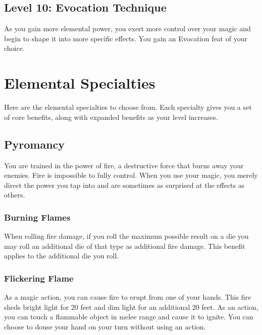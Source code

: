 \documentclass[12pt,letterpaper,twocolumn,openany,nodeprecatedcode,bg=none]{dndbook}
\begin{document}
\subsection{Level 10: Evocation
Technique}\label{level-10-evocation-technique}

As you gain more elemental power, you exert more control over your magic
and begin to shape it into more specific effects. You gain an Evocation
feat of your choice.

\clearpage

\section{Elemental Specialties}\label{elemental-specialties}

Here are the elemental specialties to choose from. Each specialty gives
you a set of core benefits, along with expanded benefits as your level
increases.

\subsection{Pyromancy}\label{pyromancy}

You are trained in the power of fire, a destructive force that burns
away your enemies. Fire is impossible to fully control. When you use
your magic, you merely direct the power you tap into and are sometimes
as surprised at the effects as others.

\subsubsection{Burning Flames}\label{burning-flames}

When rolling fire damage, if you roll the maximum possible result on a
die you may roll an additional die of that type as additional fire
damage. This benefit applies to the additional die you roll.

\subsubsection{Flickering Flame}\label{flickering-flame}

As a magic action, you can cause fire to erupt from one of your hands.
This fire sheds bright light for 20 feet and dim light for an additional
20 feet. As an action, you can touch a flammable object in melee range
and cause it to ignite. You can choose to douse your hand on your turn
without using an action.
\end{document}
